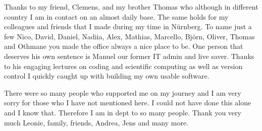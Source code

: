 Thanks to my friend, Clemens, and my brother Thomas who although in different country I am in contact on an almost daily base.
The same holds for my colleagues and friends that I made during my time in Nürnberg.
To name just a few Nico, David, Daniel, Nadiia, Alex, Mathias, Marcello, Björn, Oliver, Thomas and Othmane you made the office always a nice place to be.
One person that deserves his own sentence is Manuel our former IT admin and live saver.
Thanks to his engaging lectures on coding and scientific computing as well as version control I quickly caught up with building my own usable software. 

There were so many people who supported me on my journey and I am very sorry for those who I have not mentioned here.
I could not have done this alone and I know that. 
Therefore I am in dept to so many people.
Thank you very much Leonie, family, friends, Andrea, Jens and many more.